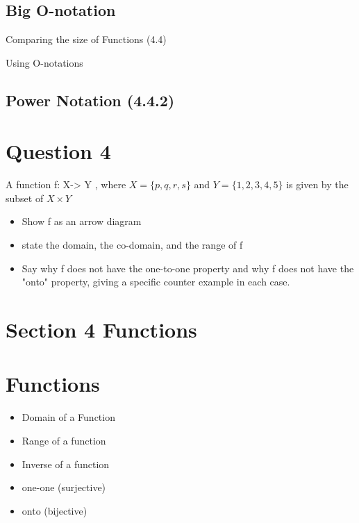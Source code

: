 \documentclass[]{report}
\begin{document}
\subsection*{Big O-notation}
Comparing the size of Functions (4.4)


Using O-notations

\subsection*{Power Notation (4.4.2)}




\section*{Question 4}

A function f: X-> Y , where $X = \{p,q,r,s\}$ and $Y =\{1,2,3,4,5\}$
is given by the subset of $X \times Y$


\begin{itemize}
\item Show f as an arrow diagram
\item state the domain, the co-domain, and the range of f
\item Say why f does not have the one-to-one property and why f does 
not have the "onto" property, giving a specific counter example in each case.
\end{itemize}


\section{Section 4 Functions}





\section*{Functions}
\begin{itemize}
\item Domain of a Function
\item Range of a function
\item Inverse of a function
\end{itemize}
\begin{itemize}
\item one-one (surjective)
\item onto (bijective)
\end{itemize}
\end{document}
